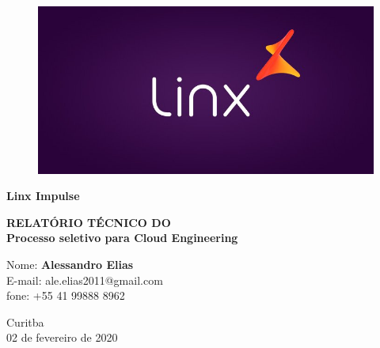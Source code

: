 \begin{titlepage}

  \begin{figure}[!ht]
    \filcenter
    \includegraphics[height=0.33\textheight, width=0.33\linewidth, keepaspectratio]{imagens/LINX-LOGO.jpg}
  \end{figure}
  \vspace{-2.5em}
  \begin{Large}
      \begin{center}
        \textbf{Linx Impulse}
  
        \vfill
  
        \textbf{RELATÓRIO TÉCNICO DO\\
        Processo seletivo para Cloud Engineering
      }
    \end{center}

    \vfill

    Nome: \textbf{Alessandro Elias}\\
    E-mail: ale.elias2011@gmail.com\\
    fone: +55 41 99888 8962

    \vfill
    
    \begin{center}
      Curitba\\
      02 de fevereiro de 2020
    \end{center}
  \end{Large}

  \clearpage
\end{titlepage}
